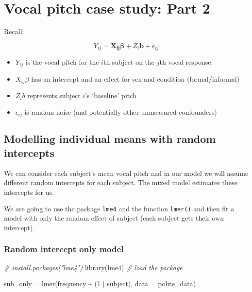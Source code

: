\documentclass[
  openany]{book}
\newenvironment{Shaded}{\begin{snugshade}}{\end{snugshade}}
\newcommand{\AttributeTok}[1]{\textcolor[rgb]{0.77,0.63,0.00}{#1}}
\newcommand{\CommentTok}[1]{\textcolor[rgb]{0.56,0.35,0.01}{\textit{#1}}}
\newcommand{\DecValTok}[1]{\textcolor[rgb]{0.00,0.00,0.81}{#1}}
\newcommand{\FunctionTok}[1]{\textcolor[rgb]{0.00,0.00,0.00}{#1}}
\newcommand{\NormalTok}[1]{#1}
\newcommand{\OtherTok}[1]{\textcolor[rgb]{0.56,0.35,0.01}{#1}}
\newcommand{\SpecialCharTok}[1]{\textcolor[rgb]{0.00,0.00,0.00}{#1}}
\providecommand{\tightlist}{%
  \setlength{\itemsep}{0pt}\setlength{\parskip}{0pt}}
\begin{document}
\hypertarget{vocal-pitch-case-study-part-2}{%
\section{Vocal pitch case study: Part 2}\label{vocal-pitch-case-study-part-2}}

Recall:

\[Y_{ij} = \boldsymbol{X_{ij}\beta} + Z_{i}\boldsymbol{b} + \epsilon_{ij}\]

\begin{itemize}
\tightlist
\item
  \(Y_{ij}\) is the vocal pitch for the \(i\)th subject on the \(j\)th vocal response.
\item
  \(X_{ij}\beta\) has an intercept and an effect for sex and condition (formal/informal)
\item
  \(Z_ib\) represents subject \(i\)'s `baseline' pitch
\item
  \(\epsilon_{ij}\) is random noise (and potentially other unmeasured confounders)
\end{itemize}

\hypertarget{modelling-individual-means-with-random-intercepts}{%
\subsection{Modelling individual means with random intercepts}\label{modelling-individual-means-with-random-intercepts}}

We can consider each subject's mean vocal pitch and in our model we will assume different random intercepts for each subject. The mixed model estimates these intercepts for us.

We are going to use the package \texttt{lme4} and the function \texttt{lmer()} and then fit a model with only the random effect of subject (each subject gets their own intercept).

\hypertarget{random-intercept-only-model}{%
\subsubsection{Random intercept only model}\label{random-intercept-only-model}}

\begin{Shaded}
\begin{Highlighting}[]
\CommentTok{\# install.packages("lme4")}
\FunctionTok{library}\NormalTok{(lme4) }\CommentTok{\# load the package}

\NormalTok{sub\_only }\OtherTok{=} \FunctionTok{lmer}\NormalTok{(frequency }\SpecialCharTok{\textasciitilde{}}\NormalTok{ (}\DecValTok{1} \SpecialCharTok{|}\NormalTok{ subject),  }\AttributeTok{data =}\NormalTok{ polite\_data)}
\end{Highlighting}
\end{Shaded}
\end{document}
